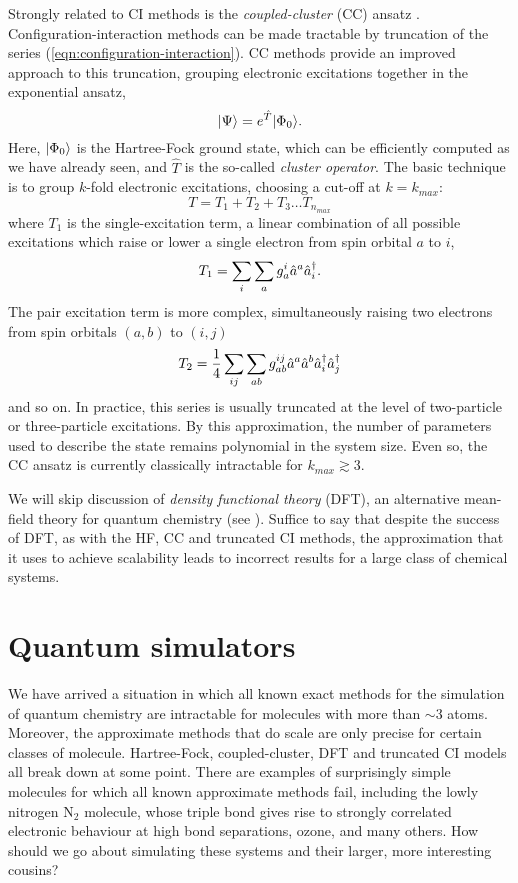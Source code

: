 Strongly related to CI methods is the \emph{coupled-cluster} (CC) ansatz \cite{Shavitt2009}.  Configuration-interaction methods can be made tractable by truncation of the series (\ref{eqn:configuration-interaction}). CC  methods provide an improved approach to this truncation, grouping electronic excitations together in the exponential ansatz,  
\begin{equation}
    \mbox{$ | \Psi \rangle $} = e^{\hat{T}} \mbox{$ | \Phi_{0} \rangle $}.
\end{equation}
Here, $\mbox{$ | \Phi_0 \rangle $}$ is the Hartree-Fock ground state, which can be efficiently computed as we have already seen, and $\hat{T}$ is the so-called \emph{cluster operator}. The basic technique is to group $k$-fold electronic excitations, choosing a cut-off at $k=k_{max}$:
\begin{equation}
    T=T_1+T_2+T_3 \ldots T_{n_{max}}
\end{equation}
where $T_1$ is the single-excitation term, a linear combination of all possible excitations which raise or lower a single electron from spin orbital $a$ to $i$,
\begin{equation}
    T_1 = \sum_i \sum_a  g_a^i \hat{a}^a \hat{a}^{\dagger}_i.
\end{equation}
 The pair excitation term is more complex, simultaneously raising two electrons from spin orbitals $(a, b)$ to $(i, j)$
\begin{equation}
    T_2 = \frac{1}{4} \sum_{ij} \sum_{ab}  g_{ab}^{ij} \hat{a}^a \hat{a}^b \hat{a}^{\dagger}_i \hat{a}^{\dagger}_j
\end{equation}
and so on. In practice, this series is usually truncated at the level of two-particle or three-particle excitations. By this approximation, the number of parameters used to describe the state remains polynomial in the system size.  Even so, the CC ansatz is currently classically intractable for $k_{max}\gtrsim3$. 

We will skip discussion of \emph{density functional theory} (DFT), an alternative mean-field theory for quantum chemistry (see \cite{Koch2001}). Suffice to say that despite the success of DFT, as with the HF, CC and truncated CI methods, the approximation that it uses to achieve scalability leads to incorrect results for a large class of chemical systems.

\section{Quantum simulators} 
We have arrived a situation in which all known exact methods for the simulation of quantum chemistry are intractable for molecules with more than $\sim$3 atoms. Moreover, the approximate methods that do scale are only precise for certain classes of molecule. Hartree-Fock, coupled-cluster, DFT and truncated CI models all break down at some point. There are examples of surprisingly simple molecules for which all known approximate methods fail, including the lowly nitrogen $\mathrm{N}_2$ molecule, whose triple bond gives rise to strongly correlated electronic behaviour at high bond separations, ozone, and many others. How should we go about simulating these systems and their larger, more interesting cousins?

